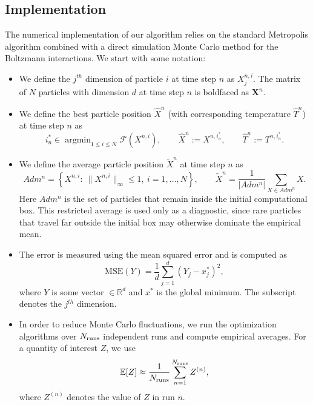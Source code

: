 \documentclass[10pt,a4paper]{article}
\theoremstyle{theorem}
\numberwithin{equation}{section}
\DeclareMathOperator*{\argmin}{argmin}
\begin{document}
\subsection{Implementation}

The numerical implementation of our algorithm relies on the standard Metropolis algorithm combined with a direct simulation Monte Carlo method for the Boltzmann interactions.\cite{babovsky_simulation_1986,borghi_wasserstein_2026} We start with some notation:
\begin{itemize}
\item We define the $j^{th}$ dimension of particle $i$ at time step $n$ as $X^{n,i}_j$. The matrix of $N$ particles with dimension $d$ at time step $n$ is boldfaced as $\mathbf{X}^{n}$.
\item We define the best particle position $\widehat{X}^n$ (with corresponding temperature $\widehat{T}^n$) at time step $n$ as
\begin{equation}
\label{eq:best}
i_n^*\in\argmin_{1\le i\le N}\mathcal F(X^{n,i}),
\qquad
\widehat X^n:=X^{n,i_n^*},
\qquad
\widehat T^n:=T^{n,i_n^*}.
\end{equation}
\item We define the average particle position $\widetilde{X}^n$ at time step $n$ as 
\begin{equation}
\label{eq:avg}
Adm^n
=
\left\{
X^{n,i}:\ \|X^{n,i}\|_\infty\leq1,\ i=1,\ldots,N
\right\},
\qquad
\widetilde X^n
=
\frac{1}{|Adm^n|}
\sum_{X\in Adm^n}X .
\end{equation}
Here \(Adm^n\) is the set of particles that remain inside the initial computational
box. This restricted average is used only as a diagnostic, since rare particles
that travel far outside the initial box may otherwise dominate the empirical mean.
\item The error is measured using the mean squared error and is computed as
\begin{equation}
\text{MSE}(Y) = \frac{1}{d}\sum_{j=1}^d\left(Y_j-x^*_j \right)^2,
\end{equation}
where $Y$ is some vector $\in\mathbb{R}^d$ and $x^*$ is the global minimum. The subscript denotes the $j^{th}$ dimension.
\item In order to reduce Monte Carlo fluctuations, we run the optimization algorithms
over \(N_{\rm runs}\) independent runs and compute empirical averages. For a
quantity of interest \(Z\), we use
\begin{equation}
\mathbb E[Z]\approx
\frac{1}{N_{\rm runs}}
\sum_{n=1}^{N_{\rm runs}}Z^{(n)},
\end{equation}
where \(Z^{(n)}\) denotes the value of \(Z\) in run \(n\).
\end{itemize} 
\end{document}
